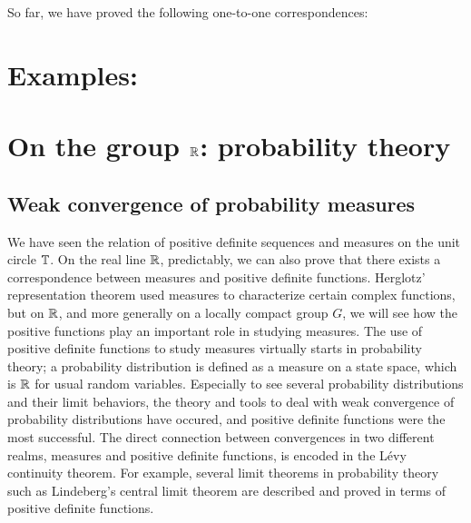 \documentclass[12pt]{article}
\begin{document}
So far, we have proved the following one-to-one correspondences:
\begin{figure}[h]
\end{figure}




\section{Examples: }






\newpage
\section{On the group $\mathbb{R}$: probability theory}

\subsection{Weak convergence of probability measures}

We have seen the relation of positive definite sequences and measures on the unit circle $\mathbb{T}$.
On the real line $\mathbb{R}$, predictably, we can also prove that there exists a correspondence between measures and positive definite functions.
Herglotz' representation theorem used measures to characterize certain complex functions, but on $\mathbb{R}$, and more generally on a locally compact group $G$, we will see how the positive functions play an important role in studying measures.
The use of positive definite functions to study measures virtually starts in probability theory; a probability distribution is defined as a measure on a state space, which is $\mathbb{R}$ for usual random variables.
Especially to see several probability distributions and their limit behaviors, the theory and tools to deal with weak convergence of probability distributions have occured, and positive definite functions were the most successful.
The direct connection between convergences in two different realms, measures and positive definite functions, is encoded in the L\'evy continuity theorem.
For example, several limit theorems in probability theory such as Lindeberg's central limit theorem are described and proved in terms of positive definite functions.
\end{document}
